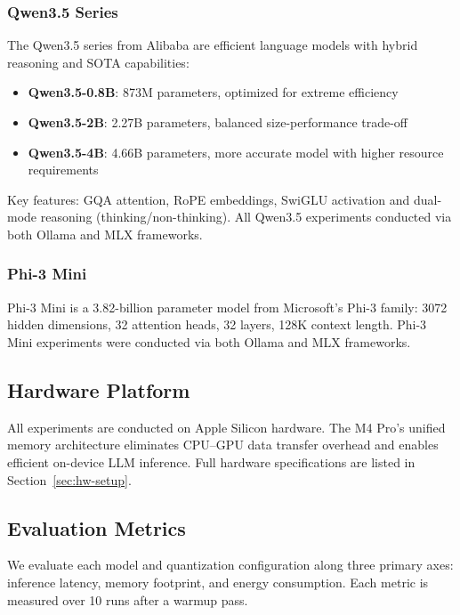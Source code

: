 \documentclass[conference]{IEEEtran}
\begin{document}
\subsubsection{Qwen3.5 Series}

The Qwen3.5 series \cite{qwen2025technical} from Alibaba are efficient language models with hybrid reasoning and SOTA capabilities:

\begin{itemize}[leftmargin=*,nosep]
    \item \textbf{Qwen3.5-0.8B}: 873M parameters, optimized for extreme efficiency
    \item \textbf{Qwen3.5-2B}: 2.27B parameters, balanced size-performance trade-off
    \item \textbf{Qwen3.5-4B}: 4.66B parameters, more accurate model with higher resource requirements
\end{itemize}

Key features: GQA attention, RoPE embeddings, SwiGLU activation and dual-mode reasoning (thinking/\allowbreak non-thinking). All Qwen3.5 experiments conducted via both Ollama and MLX frameworks.

\subsubsection{Phi-3 Mini}

Phi-3 Mini \cite{abdin2024phi3} is a 3.82-billion parameter model from Microsoft's Phi-3 family: 3072 hidden dimensions, 32 attention heads, 32 layers, 128K context length. Phi-3 Mini experiments were conducted via both Ollama and MLX frameworks.

\subsection{Hardware Platform}

All experiments are conducted on Apple Silicon hardware. The M4 Pro's unified memory architecture eliminates CPU--GPU data transfer overhead and enables efficient on-device LLM inference. Full hardware specifications are listed in Section~\ref{sec:hw-setup}.

\subsection{Evaluation Metrics}

We evaluate each model and quantization configuration along three primary axes: inference latency, memory footprint, and energy consumption. Each metric is measured over 10 runs after a warmup pass.
\end{document}
